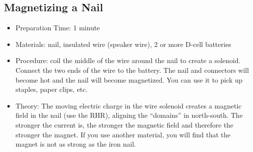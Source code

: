 
\subsection{Magnetizing a Nail}
\begin{itemize}
\item{Preparation Time: 1 minute}
\item{Materials: nail, insulated wire (speaker wire), 2 or more D-cell batteries}
\item{Procedure: coil the middle of the wire around the nail to create a solenoid. Connect the two ends of the wire to the battery. The nail and connectors will become hot and the nail will become magnetized. You can use it to pick up staples, paper clips, etc.}
\item{Theory: The moving electric charge in the wire solenoid creates a magnetic field in the nail (use the RHR), aligning the “domains” in north-south. The stronger the current is, the stronger the magnetic field and therefore the stronger the magnet. If you use another material, you will find that the magnet is not as strong as the iron nail.}
\end{itemize}




